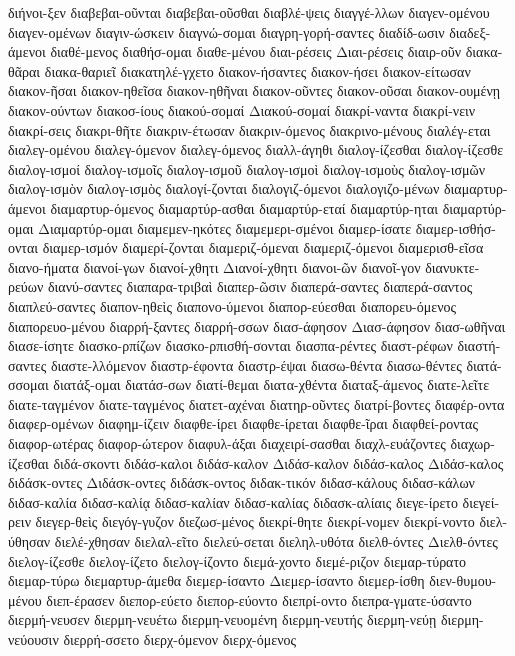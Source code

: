 {διήνοι-ξεν
διαβεβαι-οῦνται
διαβεβαι-οῦσθαι
διαβλέ-ψεις
διαγγέ-λλων
διαγεν-ομένου
διαγεν-ομένων
διαγιν-ώσκειν
διαγνώ-σομαι
διαγρη-γορή-σαντες
διαδίδ-ωσιν
διαδεξ-άμενοι
διαθέ-μενος
διαθήσ-ομαι
διαθε-μένου
διαι-ρέσεις
Διαι-ρέσεις
διαιρ-οῦν
διακα-θᾶραι
διακα-θαριεῖ
διακατηλέ-γχετο
διακον-ήσαντες
διακον-ήσει
διακον-είτωσαν
διακον-ῆσαι
διακον-ηθεῖσα
διακον-ηθῆναι
διακον-οῦντες
διακον-οῦσαι
διακον-ουμένῃ
διακον-ούντων
διακοσ-ίους
διακού-σομαί
Διακού-σομαί
διακρί-ναντα
διακρί-νειν
διακρί-σεις
διακρι-θῆτε
διακριν-έτωσαν
διακριν-όμενος
διακρινο-μένους
διαλέγ-εται
διαλεγ-ομένου
διαλεγ-όμενον
διαλεγ-όμενος
διαλλ-άγηθι
διαλογ-ίζεσθαι
διαλογ-ίζεσθε
διαλογ-ισμοί
διαλογ-ισμοῖς
διαλογ-ισμοῦ
διαλογ-ισμοὶ
διαλογ-ισμοὺς
διαλογ-ισμῶν
διαλογ-ισμὸν
διαλογ-ισμὸς
διαλογί-ζονται
διαλογιζ-όμενοι
διαλογιζο-μένων
διαμαρτυρ-άμενοι
διαμαρτυρ-όμενος
διαμαρτύρ-ασθαι
διαμαρτύρ-εταί
διαμαρτύρ-ηται
διαμαρτύρ-ομαι
Διαμαρτύρ-ομαι
διαμεμεν-ηκότες
διαμεμερι-σμένοι
διαμερ-ίσατε
διαμερ-ισθήσ-ονται
διαμερ-ισμόν
διαμερί-ζονται
διαμεριζ-όμεναι
διαμεριζ-όμενοι
διαμερισθ-εῖσα
διανο-ήματα
διανοί-γων
διανοί-χθητι
Διανοί-χθητι
διανοι-ῶν
διανοῖ-γον
διανυκτε-ρεύων
διανύ-σαντες
διαπαρα-τριβαὶ
διαπερ-ῶσιν
διαπερά-σαντες
διαπερά-σαντος
διαπλεύ-σαντες
διαπον-ηθεὶς
διαπονο-ύμενοι
διαπορ-εύεσθαι
διαπορευ-όμενος
διαπορευο-μένου
διαρρή-ξαντες
διαρρή-σσων
διασ-άφησον
Διασ-άφησον
διασ-ωθῆναι
διασε-ίσητε
διασκο-ρπίζων
διασκο-ρπισθή-σονται
διασπα-ρέντες
διαστ-ρέφων
διαστή-σαντες
διαστε-λλόμενον
διαστρ-έφοντα
διαστρ-έψαι
διασω-θέντα
διασω-θέντες
διατά-σσομαι
διατάξ-ομαι
διατάσ-σων
διατί-θεμαι
διατα-χθέντα
διαταξ-άμενος
διατε-λεῖτε
διατε-ταγμένον
διατε-ταγμένος
διατετ-αχέναι
διατηρ-οῦντες
διατρί-βοντες
διαφέρ-οντα
διαφερ-ομένων
διαφημ-ίζειν
διαφθε-ίρει
διαφθε-ίρεται
διαφθε-ῖραι
διαφθεί-ροντας
διαφορ-ωτέρας
διαφορ-ώτερον
διαφυλ-άξαι
διαχειρί-σασθαι
διαχλ-ευάζοντες
διαχωρ-ίζεσθαι
διδά-σκοντι
διδάσ-καλοι
διδάσ-καλον
Διδάσ-καλον
διδάσ-καλος
Διδάσ-καλος
διδάσκ-οντες
Διδάσκ-οντες
διδάσκ-οντος
διδακ-τικόν
διδασ-κάλους
διδασ-κάλων
διδασ-καλία
διδασ-καλίᾳ
διδασ-καλίαν
διδασ-καλίας
διδασκ-αλίαις
διεγε-ίρετο
διεγεί-ρειν
διεγερ-θεὶς
διεγόγ-γυζον
διεζωσ-μένος
διεκρί-θητε
διεκρί-νομεν
διεκρί-νοντο
διελ-ύθησαν
διελέ-χθησαν
διελαλ-εῖτο
διελεύ-σεται
διεληλ-υθότα
διελθ-όντες
Διελθ-όντες
διελογ-ίζεσθε
διελογ-ίζετο
διελογ-ίζοντο
διεμά-χοντο
διεμέ-ριζον
διεμαρ-τύρατο
διεμαρ-τύρω
διεμαρτυρ-άμεθα
διεμερ-ίσαντο
Διεμερ-ίσαντο
διεμερ-ίσθη
διεν-θυμου-μένου
διεπ-έρασεν
διεπορ-εύετο
διεπορ-εύοντο
διεπρί-οντο
διεπρα-γματε-ύσαντο
διερμή-νευσεν
διερμη-νευέτω
διερμη-νευομένη
διερμη-νευτής
διερμη-νεύῃ
διερμη-νεύουσιν
διερρή-σσετο
διερχ-όμενον
διερχ-όμενος
}
